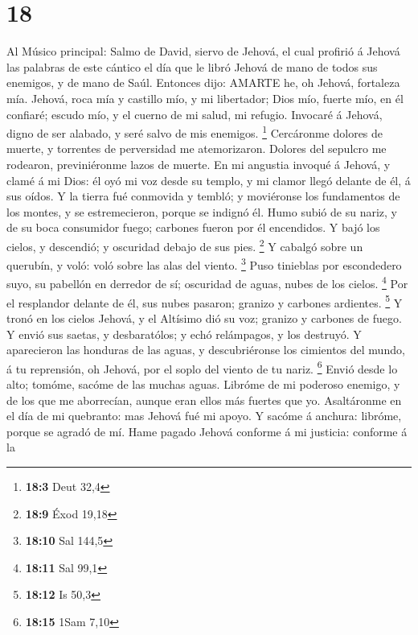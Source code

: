 \hypertarget{section-17}{%
\section{18}\label{section-17}}

 Al Músico principal: Salmo de David, siervo de Jehová, el
cual profirió á Jehová las palabras de este cántico el día que le libró
Jehová de mano de todos sus enemigos, y de mano de Saúl. Entonces dijo:
AMARTE he, oh Jehová, fortaleza mía.  Jehová, roca mía y
castillo mío, y mi libertador; Dios mío, fuerte mío, en él confiaré;
escudo mío, y el cuerno de mi salud, mi refugio.  Invocaré á
Jehová, digno de ser alabado, y seré salvo de mis enemigos. \footnote{\textbf{18:3}
  Deut 32,4}  Cercáronme dolores de muerte, y torrentes de
perversidad me atemorizaron.  Dolores del sepulcro me
rodearon, previniéronme lazos de muerte.  En mi angustia
invoqué á Jehová, y clamé á mi Dios: él oyó mi voz desde su templo, y mi
clamor llegó delante de él, á sus oídos.  Y la tierra fué
conmovida y tembló; y moviéronse los fundamentos de los montes, y se
estremecieron, porque se indignó él.  Humo subió de su
nariz, y de su boca consumidor fuego; carbones fueron por él encendidos.
 Y bajó los cielos, y descendió; y oscuridad debajo de sus
pies. \footnote{\textbf{18:9} Éxod 19,18}  Y cabalgó sobre
un querubín, y voló: voló sobre las alas del viento. \footnote{\textbf{18:10}
  Sal 144,5}  Puso tinieblas por escondedero suyo, su
pabellón en derredor de sí; oscuridad de aguas, nubes de los cielos.
\footnote{\textbf{18:11} Sal 99,1}  Por el resplandor
delante de él, sus nubes pasaron; granizo y carbones ardientes.
\footnote{\textbf{18:12} Is 50,3}  Y tronó en los cielos
Jehová, y el Altísimo dió su voz; granizo y carbones de fuego.
 Y envió sus saetas, y desbaratólos; y echó relámpagos, y
los destruyó.  Y aparecieron las honduras de las aguas, y
descubriéronse los cimientos del mundo, á tu reprensión, oh Jehová, por
el soplo del viento de tu nariz. \footnote{\textbf{18:15} 1Sam 7,10}
 Envió desde lo alto; tomóme, sacóme de las muchas aguas.
 Libróme de mi poderoso enemigo, y de los que me
aborrecían, aunque eran ellos más fuertes que yo. 
Asaltáronme en el día de mi quebranto: mas Jehová fué mi apoyo.
 Y sacóme á anchura: libróme, porque se agradó de mí.
 Hame pagado Jehová conforme á mi justicia: conforme á la
